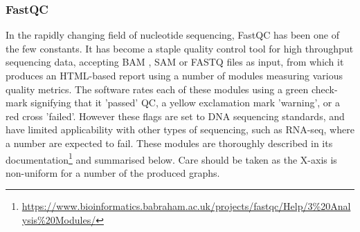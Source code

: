 \subsubsection{FastQC}
In the rapidly changing field of nucleotide sequencing, FastQC \citep{andrews2010fastqc} has been one of the few constants. It has become a staple quality control tool for high throughput sequencing data, accepting BAM \citep{BAM}, SAM or FASTQ files as input, from which it produces an HTML-based report using a number of modules measuring various quality metrics. The software rates each of these modules using a green check-mark signifying that it 'passed' QC, a yellow exclamation mark 'warning', or a red cross 'failed'. However these flags are set to DNA sequencing standards, and have limited applicability with other types of sequencing, such as RNA-seq, where a number are expected to fail. These modules are thoroughly described in its documentation\footnote{\url{https://www.bioinformatics.babraham.ac.uk/projects/fastqc/Help/3\%20Analysis\%20Modules/}} and summarised below. Care should be taken as the X-axis is non-uniform for a number of the produced graphs.

